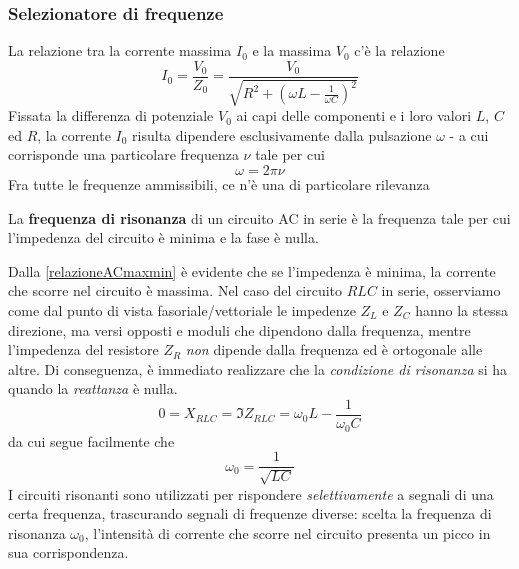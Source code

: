 \subsubsection{Selezionatore di frequenze}
La relazione tra la corrente massima $I_0$ e la \ddp massima $V_0$ c'è la relazione
\begin{equation}\label{relazioneACmaxmin}
	I_0=\frac{V_0}{Z_0}=\frac{V_0}{\sqrt{R^2+\left(\omega L -\frac{1}{\omega C}\right)^2}}
\end{equation}
Fissata la differenza di potenziale $V_0$ ai capi delle componenti e i loro valori $L$, $C$ ed $R$, la corrente $I_0$ risulta dipendere esclusivamente dalla pulsazione $\omega$ - a cui corrisponde una particolare frequenza $\nu$ tale per cui
\begin{equation}
	\omega=2\pi \nu
\end{equation}
Fra tutte le frequenze ammissibili, ce n'è una di particolare rilevanza
\begin{define}
	La \textbf{frequenza di risonanza} di un circuito AC in serie è la frequenza tale per cui l'impedenza del circuito è minima e la fase è nulla.
\end{define}
Dalla \eqref{relazioneACmaxmin} è evidente che se l'impedenza è minima, la corrente che scorre nel circuito è massima.
Nel caso del circuito $RLC$ in serie, osserviamo come dal punto di vista fasoriale/vettoriale le impedenze $Z_L$ e $Z_C$ hanno la stessa direzione, ma versi opposti e moduli che dipendono dalla frequenza, mentre l'impedenza del resistore $Z_R$ \textit{non} dipende dalla frequenza ed è ortogonale alle altre. Di conseguenza, è immediato realizzare che la \textit{condizione di risonanza} si ha quando la \textit{reattanza} è nulla.
\begin{equation*}
	0=X_{RLC}=\Im Z_{RLC}=\omega_0 L-\frac{1}{\omega_0 C}
\end{equation*}
da cui segue facilmente che
\begin{equation*}
	\omega_0=\frac{1}{\sqrt{LC}}
\end{equation*}
I circuiti risonanti sono utilizzati per rispondere \textit{selettivamente} a segnali di una certa frequenza, trascurando segnali di frequenze diverse: scelta la frequenza di risonanza $\omega_0$, l'intensità di corrente che scorre nel circuito presenta un picco in sua corrispondenza.

